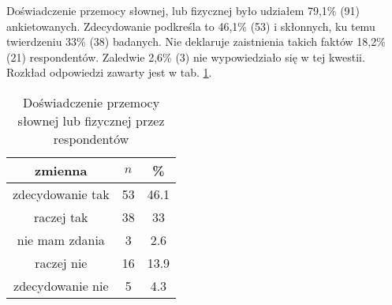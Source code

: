 
Doświadczenie przemocy słownej, lub fizycznej było udziałem 79,1\% (91) ankietowanych. Zdecydowanie podkreśla to 46,1\% (53) i skłonnych, ku temu twierdzeniu 33\% (38) badanych. Nie deklaruje zaistnienia takich faktów 18,2\% (21) respondentów. Zaledwie 2,6\% (3) nie wypowiedziało się w tej kwestii. Rozkład odpowiedzi zawarty jest w tab. \ref{tab:Q16}. 

\begin{table}[H]
\caption{Doświadczenie przemocy słownej lub fizycznej przez respondentów}
\centering
\begin{tabular}{ | c | c | c |}
\hline
zmienna & $n$ & \% \\
\hline
zdecydowanie tak  &  53  & 46.1 \\
\hline
raczej tak  &  38  & 33 \\
\hline
nie mam zdania  &  3  & 2.6\\
\hline
raczej nie  &  16  & 13.9 \\
\hline
zdecydowanie nie  &  5  & 4.3 \\
\hline
\end{tabular}
\label{tab:Q16}
\end{table}
